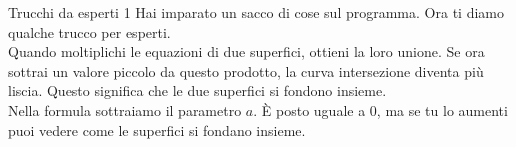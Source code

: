 \begin{surferPage}{Trucchi da esperti 1}
Hai imparato un sacco di cose sul programma. Ora ti diamo qualche trucco per esperti.\\
\vspace{0.3cm}
Quando moltiplichi le equazioni di due superfici, ottieni la loro unione. Se ora sottrai un valore piccolo da questo prodotto, la curva intersezione diventa pi\`u liscia. Questo significa che le due superfici si fondono insieme.\\
\vspace{0.3cm}
Nella formula sottraiamo il parametro $a$. \`E posto uguale a $0$, ma se tu lo aumenti puoi vedere come le superfici si fondano insieme.
\end{surferPage}
